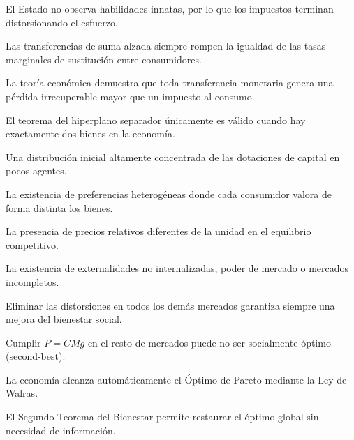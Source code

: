 \begin{opts}
    \item El Estado no observa habilidades innatas, por lo que los impuestos terminan distorsionando el esfuerzo.
    \item Las transferencias de suma alzada siempre rompen la igualdad de las tasas marginales de sustitución entre consumidores.
    \item La teoría económica demuestra que toda transferencia monetaria genera una pérdida irrecuperable mayor que un impuesto al consumo.
    \item El teorema del hiperplano separador únicamente es válido cuando hay exactamente dos bienes en la economía.
\end{opts}

\begin{opts}
    \item Una distribución inicial altamente concentrada de las dotaciones de capital en pocos agentes.
    \item La existencia de preferencias heterogéneas donde cada consumidor valora de forma distinta los bienes.
    \item La presencia de precios relativos diferentes de la unidad en el equilibrio competitivo.
    \item La existencia de externalidades no internalizadas, poder de mercado o mercados incompletos.
\end{opts}

\begin{opts}
    \item Eliminar las distorsiones en todos los demás mercados garantiza siempre una mejora del bienestar social.
    \item Cumplir $P = CMg$ en el resto de mercados puede no ser socialmente óptimo (second-best).
    \item La economía alcanza automáticamente el Óptimo de Pareto mediante la Ley de Walras.
    \item El Segundo Teorema del Bienestar permite restaurar el óptimo global sin necesidad de información.
\end{opts}

